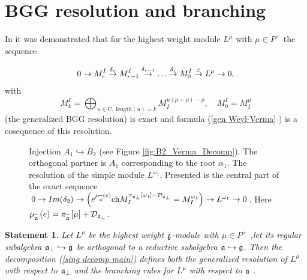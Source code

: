\documentclass[12pt]{article}
\newtheorem{statement}{Statement}
\theoremstyle{definition}
\newcommand{\aft}{\widetilde{\mathfrak{a}}}
\newcommand{\afb}{\mathfrak{a}_{\bot}}
\begin{document}
\section{BGG resolution and branching}

In \cite{lepowsky1977generalization} it was demonstrated that for the
highest weight module $L^{\mu }$ with $\mu \in P^{+}$ the sequence

\begin{equation}
0\rightarrow M_{r}^{I}\overset{\delta _{r}}{\rightarrow }M_{r-1}^{I}\overset{%
\delta _{r-1}}{\rightarrow }\ldots \overset{\delta _{1}}{\rightarrow }%
M_{0}^{I}\overset{\varepsilon }{\rightarrow }L^{\mu }\rightarrow 0,
\label{resolution sequence}
\end{equation}
with
\begin{equation}
M_{k}^{I}=\bigoplus_{u\in U,\;\mathrm{length}\left( u\right)
=k}M_{I}^{u\left( \mu +\rho \right) -\rho },\quad M_{0}^{I}=M_{I}^{\mu }
\label{Verma elements sequence}
\end{equation}
(the generalized BGG resolution) is exact and formula (\ref{gen Weyl-Verma}%
) is a cosequence of this resolution.

\begin{figure}[h!bt]
 \noindent{}
 \caption{Injection $A_1\hookrightarrow B_2$ (see Figure \ref{fig:B2_Verma_Decomp}).
 The orthogonal partner is $A_1$ corresponding to the root $\alpha_1$.
 The resolution of the simple module $L^{\omega_1}$.
 Presented is the central part of the exact sequence
   $0 \to Im(\delta_2) \to \left( e^{\mu _{\widetilde{%
\frak{a}}}\left( e\right) }\mathrm{ch}M_{I}^{\pi _{\afb}\left[ \omega_1 \right] -%
\mathcal{D}_{\afb} }=M^{\omega_1}_{I}\right) \to
   L^{\omega_1}\to 0 $.  Here $\mu _{\widetilde{\frak{a}}}\left( e\right) =\pi _{\aft}\left[ \mu \right] + \mathcal{D}_{\afb}$.
   }
\end{figure}


\begin{statement}

Let $L^{\mu }$ be the highest weight $\frak{g}$-module with $\mu \in P^{+}$
,let its regular subalgebra $\mathfrak{a}_{\bot }\hookrightarrow \frak{g}$
be orthogonal to a reductive subalgebra $\frak{a}\hookrightarrow \frak{g}$.
Then the decomposition (\ref{sing decomp main}) defines both the generalized
resolution of $L^{\mu }$ with respect to $\frak{a}_{\perp }$ and the
branching rules for $L^{\mu }$ with respect to $\frak{a}$ .
\end{statement}
\end{document}
